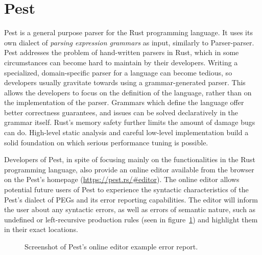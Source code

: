 \documentclass[english,engineering]{wizthesis}
\newcommand{\paraphrase}[1]{#1}
\newcommand{\thisproject}{Parser-parser}
\begin{document}
\section*{Pest}

Pest \cite{pest} is a general purpose parser for the Rust programming language.
It uses its own dialect of \emph{parsing expression grammars} as input,
similarly to \thisproject{}. Pest addresses the problem of hand-written parsers
in Rust, which in some circumstances can become hard to maintain by their
developers. Writing a specialized, domain-specific parser for a language can
become tedious, so developers usually gravitate towards using a
grammar-generated parser. This allows the developers to focus on the definition
of the language, rather than on the implementation of the parser.
\paraphrase{Grammars which define the language offer better correctness
guarantees, and issues can be solved declaratively in the grammar itself. Rust's
memory safety further limits the amount of damage bugs can do. High-level static
analysis and careful low-level implementation build a solid foundation on which
serious performance tuning is possible.}

Developers of Pest, in spite of focusing mainly on the functionalities in the
Rust programming language, also provide an online editor available from the
browser on the Pest's homepage (\url{https://pest.rs/#editor}). The online
editor allows potential future users of Pest to experience the syntactic
characteristics of the Pest's dialect of PEGs and its error reporting
capabilities. The editor will inform the user about any syntactic errors, as
well as errors of semantic nature, such as undefined or left-recursive
production rules (seen in figure~\ref{fig:pest-error}) and highlight them in
their exact locations.

\begin{figure}[ht]
  \centering
  \caption{Screenshot of Pest's online editor example error report.}
  \label{fig:pest-error}
\end{figure}
\end{document}
